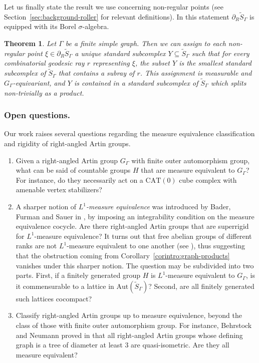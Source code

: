 \documentclass[JEP,XML,SOM,Unicode,NoFloatCountersInSection,published]{cedram}
\theoremstyle{plain}
\newtheorem{theointro}{Theorem}
\theoremstyle{definition}
\newcommand{\Aut}{\mathrm{Aut}}
\begin{document}
Let us finally state the result we use concerning non-regular points (see Section~\ref{sec:background-roller} for relevant definitions). In this statement $\partial_R\widetilde{S}_\Gamma$ is equipped with its Borel $\sigma$-algebra.

\begin{theointro}\label{theointro:roller}
Let $\Gamma$ be a finite simple graph. Then we can assign to each non-regular point $\xi\in\partial_R\widetilde{S}_\Gamma$ a unique standard subcomplex $Y\subseteq\widetilde{S}_\Gamma$ such that for every combinatorial geodesic ray $r$ representing $\xi$, the subset $Y$ is the smallest standard subcomplex of $\widetilde{S}_\Gamma$ that contains a subray of $r$. This assignment is measurable and $G_\Gamma$-equivariant, and $Y$ is contained in a standard subcomplex of $\widetilde{S}_\Gamma$ which splits non-trivially as a product.
\end{theointro}

\subsubsection*{Open questions.} Our work raises several questions regarding the measure equivalence classification and rigidity of right-angled Artin groups.
\begin{enumerate}
\item Given a right-angled Artin group $G_\Gamma$ with finite outer automorphism group, what can be said of countable groups $H$ that are measure equivalent to $G_\Gamma$? For instance, do they necessarily act on a $\mathrm{CAT}(0)$ cube complex with amenable vertex stabilizers?
\item A sharper notion of \emph{$L^1$-measure equivalence} was introduced by Bader, Furman and Sauer in \cite{BFS}, by imposing an integrability condition on the measure equivalence cocycle. Are there right-angled Artin groups that are superrigid for $L^1$-measure equivalence? It turns out that free abelian groups of different ranks are not $L^1$-measure equivalent to one another (see \cite{Aus}), thus suggesting that the obstruction coming from Corollary~\ref{corintro:graph-products} vanishes under this sharper notion. The question may be subdivided into two parts. First, if a finitely generated group $H$ is $L^1$-measure equivalent to $G_\Gamma$, is it commensurable to a lattice in $\Aut(\widetilde{S}_\Gamma)$? Second, are all finitely generated such lattices cocompact?
\item Classify right-angled Artin groups up to measure equivalence, beyond the class of those with finite outer automorphism group. For instance, Behrstock and Neumann proved in \cite{behrstock2008quasi} that all right-angled Artin groups whose defining graph is a tree of diameter at least $3$ are quasi-isometric. Are they all measure equivalent?
\end{enumerate}
\end{document}
